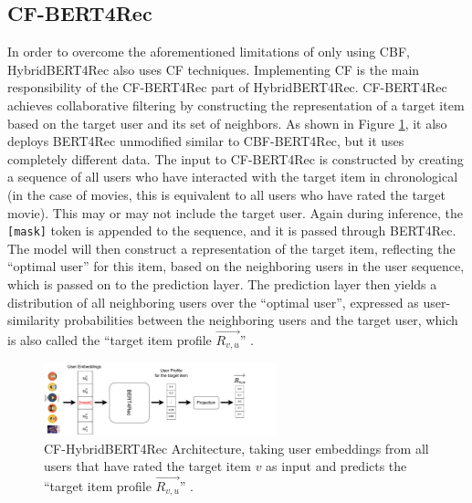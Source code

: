 \documentclass{Academic}
\begin{document}
        \subsection{CF-BERT4Rec}\label{sec:cf_bert4rec}
        In order to overcome the aforementioned limitations of only using CBF, HybridBERT4Rec also uses CF techniques. Implementing CF is the main responsibility of the CF-BERT4Rec part of HybridBERT4Rec. CF-BERT4Rec achieves collaborative filtering by constructing the representation of a target item based on the target user and its set of neighbors. As shown in Figure \ref{fig:cf-arch}, it also deploys BERT4Rec unmodified similar to CBF-BERT4Rec, but it uses completely different data. The input to CF-BERT4Rec is constructed by creating a sequence of all users who have interacted with the target item in chronological (in the case of movies, this is equivalent to all users who have rated the target movie). This may or may not include the target user. Again during inference, the \texttt{[mask]} token is appended to the sequence, and it is passed through BERT4Rec. The model will then construct a representation of the target item, reflecting the \enquote{optimal user} for this item, based on the neighboring users in the user sequence, which is passed on to the prediction layer. The prediction layer then yields a distribution of all neighboring users over the \enquote{optimal user}, expressed as user-similarity probabilities between the neighboring users and the target user, which is also called the \enquote{target item profile $\overrightarrow{R_{v,u}}$} \cite{channarongHybridBERT4RecHybridContentBased2022}.
        \begin{figure}[ht!]
            \centering
            \includegraphics[width=0.6\textwidth]{images/CF-HybridBERT4Rec.pdf}
            \caption{CF-HybridBERT4Rec Architecture, taking user embeddings from all users that have rated the target item $v$ as input and predicts the \enquote{target item profile $\overrightarrow{R_{v,u}}$} \cite{channarongHybridBERT4RecHybridContentBased2022}.}
            \label{fig:cf-arch}
        \end{figure} \\
\end{document}
